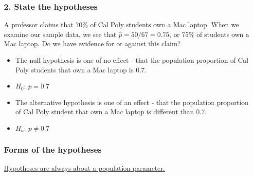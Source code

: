 \begin{frame}
\frametitle{2. State the hypotheses}
A professor claims that 70\% of Cal Poly students own a Mac laptop.  When we examine our sample data, we see that $\hat{p}=50/67=0.75$, or 75\% of students own a Mac laptop.  Do we have evidence for or against this claim?
\vskip10pt
\begin{itemize}
    \item
    The null hypothesis is one of no effect - that the population proportion of Cal Poly students that own a Mac laptop is 0.7.
    \item[]
    $H_0$: $p=0.7$
    \item
    The alternative hypothesis is one of an effect - that the population proportion of Cal Poly student that own a Mac laptop is different than 0.7.
    \item[]
    $H_a$: $p \neq 0.7$
\end{itemize}
\end{frame}


\begin{frame}
\frametitle{Forms of the hypotheses}
\underline{Hypotheses are always about a population parameter.}\\
\vskip10pt
\end{frame}

